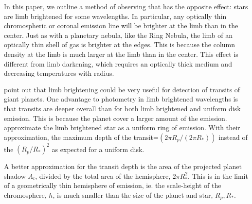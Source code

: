 \documentclass[manuscript]{aastex}
\begin{document}
In this paper, we outline a method of observing that has the opposite
effect: stars are limb brightened for some wavelengths. In
particular, any optically thin chromospheric or coronal emission line will be
brighter at the limb than in the center. Just as with a planetary
nebula, like the Ring Nebula, the limb of an optically thin shell of
gas is brighter at the edges. This is because the column density at
the limb is much larger at the limb than in the center. This effect is
different from limb darkening, which requires an optically thick
medium and decreasing temperatures with radius.

\citet{assef} point out that limb brightening could be
very useful for detection of transits of giant planets. One advantage
to photometry in limb brightened wavelengths is that transits are
deeper overall than for both limb brightened and uniform disk
emission. This is because the planet cover a larger amount of the
emission. \citet{assef} approximate the limb brightened
star as a uniform ring of emission. With their approximation, the maximum depth
of the transit=$(2\pi R_p/ (2\pi R_*))$ instead of the $(R_p/R_*)^2$
as expected for a uniform disk.

A better approximation for the transit depth is the area of the
projected planet shadow $A_t$, divided by the total area of the
hemisphere, $2\pi R_*^2$. This is in the limit of a geometrically thin
hemisphere of emission, ie. the scale-height of the chromosphere, $h$,
is much smaller than the size of the planet and star, $R_p, R_*$.


\end{document}
